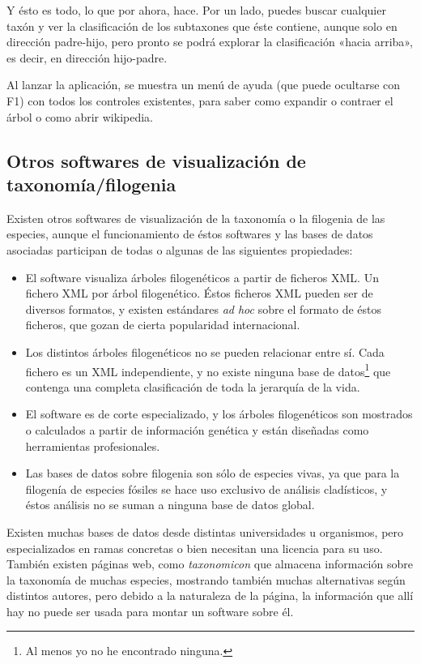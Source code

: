 Y ésto es todo, lo que por ahora, \fpt hace. Por un lado, puedes
buscar cualquier taxón y ver la clasificación de los subtaxones que
éste contiene, aunque solo en dirección
padre-hijo, pero pronto se podrá explorar la clasificación «hacia
  arriba», es decir, en dirección hijo-padre.

Al lanzar la aplicación, se muestra un menú de ayuda (que puede
ocultarse con F1) con todos los controles existentes, para saber como
expandir o contraer el árbol o como abrir wikipedia.

\subsection{Otros softwares de visualización de taxonomía/filogenia}
Existen otros softwares de visualización de la taxonomía o la
filogenia de las especies, aunque el funcionamiento de éstos softwares
y las bases de datos asociadas participan de todas o algunas de las
siguientes propiedades:

\begin{itemize}
\item El software visualiza árboles filogenéticos a partir de ficheros
  XML. Un fichero XML por árbol filogenético. Éstos ficheros XML
  pueden ser de diversos formatos, y existen estándares \textit{ad
    hoc} sobre el formato de éstos ficheros, que gozan de cierta
  popularidad internacional.
\item Los distintos árboles filogenéticos no se pueden relacionar
  entre sí. Cada fichero es un XML independiente, y no existe ninguna
  base de datos\footnote{Al menos yo no he encontrado ninguna.} que
  contenga una completa clasificación de toda la jerarquía de la
  vida.
\item El software es de corte especializado, y los árboles
  filogenéticos son mostrados o calculados a partir de información
  genética y están diseñadas como herramientas profesionales.
\item Las bases de datos sobre filogenia son sólo de especies vivas,
  ya que para la filogenía de especies fósiles se hace uso exclusivo
  de análisis cladísticos, y éstos análisis no se suman a ninguna base
  de datos global.
\end{itemize}

Existen muchas bases de datos desde distintas universidades u
organismos, pero especializados en ramas concretas o bien necesitan
una licencia para su uso. También existen páginas web, como
\textit{taxonomicon} que almacena información sobre la taxonomía de
muchas especies, mostrando también muchas alternativas según distintos
autores, pero debido a la naturaleza de la página, la información que
allí hay no puede ser usada para montar un software sobre él.

